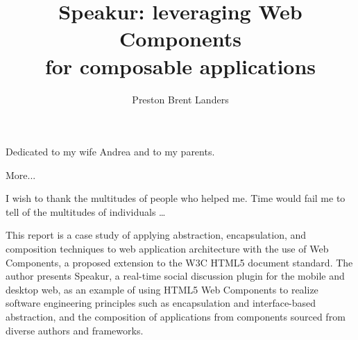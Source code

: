 \documentclass[12pt]{report}	%
\author{Preston Brent Landers}  	%
\title{Speakur: leveraging Web Components \\ for composable applications}
\theoremstyle{definition}
\theoremstyle{remark}
\begin{document}
\copyrightpage          %


%
%
%
\commcertpage           %

\titlepage              %



%
\begin{dedication}
%
Dedicated to my wife Andrea and to my parents.

More...
\end{dedication}


\begin{acknowledgments}		%
%
I wish to thank the multitudes of people who helped me. Time would
fail me to tell of the multitudes of individuals \ldots
\end{acknowledgments}


%
\utabstract
{}%
\indent

This report is a case study of applying abstraction, encapsulation, and composition techniques to web application architecture with the use of Web Components, 
a proposed extension to the W3C HTML5 document standard. 
The author presents Speakur, a real-time social discussion plugin for the mobile and desktop web, 
as an example of using HTML5 Web Components to realize software engineering principles such as encapsulation and interface-based abstraction, and the composition of applications from components sourced from diverse authors and frameworks.
\end{document}
